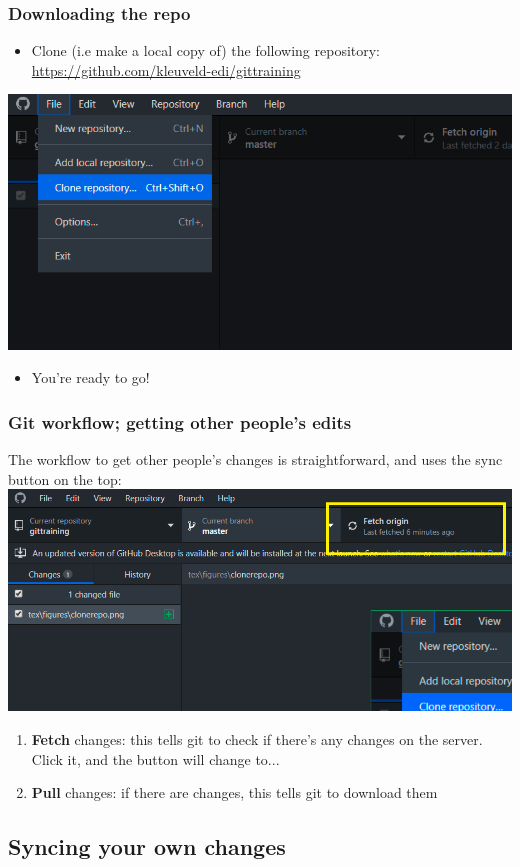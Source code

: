 \documentclass{beamer}
\begin{document}
\begin{frame}
\frametitle{Downloading the repo}
	\begin{itemize}
			\item Clone (i.e make a local copy of) the following repository: \url{https://github.com/kleuveld-edi/gittraining}
	\end{itemize}
	\hfill\includegraphics[width=0.5\linewidth]{figures/clonerepo.png}\hfill\strut
	\begin{itemize}
			\item You're ready to go!
	\end{itemize}
\end{frame}

\begin{frame}
	\frametitle{Git workflow; getting other people's edits}
	The workflow to get other people's changes is straightforward, and uses the sync button on the top:
	\hfill\includegraphics[width=0.5\linewidth]{figures/fetch.png}\hfill\strut
	\begin{enumerate}
		\item<2-> \textbf{Fetch} changes: this tells git to check if there's any changes on the server. Click it, and the button will change to...
		\item<2-> \textbf{Pull} changes: if there are changes, this tells git to download them
	\end{enumerate}

\end{frame}

\subsection{Syncing your own changes}
\end{document}
